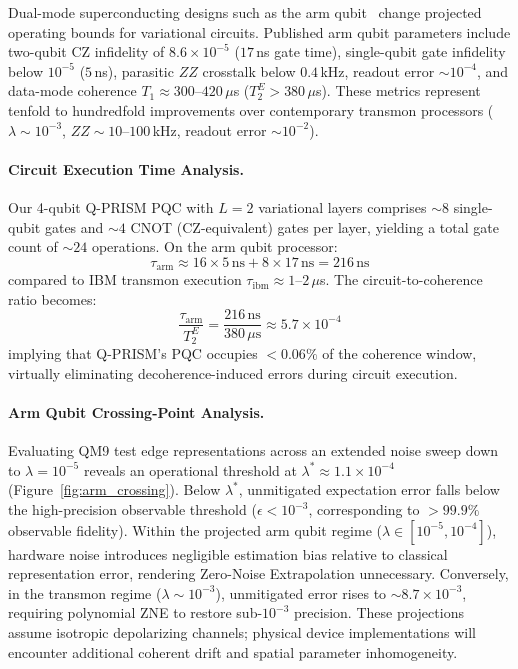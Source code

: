 \documentclass[10pt,twocolumn,letterpaper]{article}
\begin{document}
Dual-mode superconducting designs such as the arm qubit~\cite{Kline:2025ecg} change projected operating bounds for variational circuits. Published arm qubit parameters include two-qubit CZ infidelity of $8.6 \times 10^{-5}$ ($17$\,ns gate time), single-qubit gate infidelity below $10^{-5}$ ($5$\,ns), parasitic $ZZ$ crosstalk below $0.4$\,kHz, readout error $\sim 10^{-4}$, and data-mode coherence $T_1 \approx 300$--$420\,\mu$s ($T_2^E > 380\,\mu$s). These metrics represent tenfold to hundredfold improvements over contemporary transmon processors ($\lambda \sim 10^{-3}$, $ZZ \sim 10$--$100$\,kHz, readout error $\sim 10^{-2}$).

\paragraph{Circuit Execution Time Analysis.}
Our 4-qubit Q-PRISM PQC with $L = 2$ variational layers comprises $\sim 8$ single-qubit gates and $\sim 4$ CNOT (CZ-equivalent) gates per layer, yielding a total gate count of $\sim 24$ operations. On the arm qubit processor:
\begin{equation}
    \tau_{\mathrm{arm}} \approx 16 \times 5\,\mathrm{ns} + 8 \times 17\,\mathrm{ns} = 216\,\mathrm{ns}
\end{equation}
compared to IBM transmon execution $\tau_{\mathrm{ibm}} \approx 1$--$2\,\mu$s. The circuit-to-coherence ratio becomes:
\begin{equation}
    \frac{\tau_{\mathrm{arm}}}{T_2^E} = \frac{216\,\mathrm{ns}}{380\,\mu\mathrm{s}} \approx 5.7 \times 10^{-4}
\end{equation}
implying that Q-PRISM's PQC occupies $< 0.06\%$ of the coherence window, virtually eliminating decoherence-induced errors during circuit execution.

\paragraph{Arm Qubit Crossing-Point Analysis.}
Evaluating QM9 test edge representations across an extended noise sweep down to $\lambda = 10^{-5}$ reveals an operational threshold at $\lambda^* \approx 1.1 \times 10^{-4}$ (Figure~\ref{fig:arm_crossing}). Below $\lambda^*$, unmitigated expectation error falls below the high-precision observable threshold ($\epsilon < 10^{-3}$, corresponding to $> 99.9\%$ observable fidelity). Within the projected arm qubit regime ($\lambda \in [10^{-5}, 10^{-4}]$), hardware noise introduces negligible estimation bias relative to classical representation error, rendering Zero-Noise Extrapolation unnecessary. Conversely, in the transmon regime ($\lambda \sim 10^{-3}$), unmitigated error rises to $\sim 8.7 \times 10^{-3}$, requiring polynomial ZNE to restore sub-$10^{-3}$ precision. These projections assume isotropic depolarizing channels; physical device implementations will encounter additional coherent drift and spatial parameter inhomogeneity.
\end{document}
